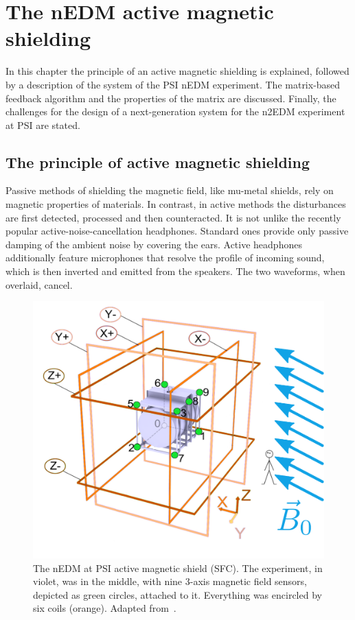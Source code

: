 \chapter{The nEDM active magnetic shielding}

\label{ch:nedm_sfc}
In this chapter the principle of an active magnetic shielding is explained, followed by a description of the system of the PSI nEDM experiment. The matrix-based feedback algorithm and the properties of the matrix are discussed. Finally, the challenges for the design of a next-generation system for the n2EDM experiment at PSI are stated.




\section{The principle of active magnetic shielding}
Passive methods of shielding the magnetic field, like mu-metal shields, rely on magnetic properties of materials. In contrast, in active methods the disturbances are first detected, processed and then counteracted. It is not unlike the recently popular active-noise-cancellation headphones. Standard ones provide only passive damping of the ambient noise by covering the ears. Active headphones additionally feature microphones that resolve the profile of incoming sound, which is then inverted and emitted from the speakers. The two waveforms, when overlaid, cancel.

\begin{figure}
  \centering
  \includegraphics[width=0.8\linewidth]{gfx/nEDM_SFC/SFCplain.pdf}
  \caption{The nEDM at PSI active magnetic shield (SFC). The experiment, in violet, was in the middle, with nine 3-axis magnetic field sensors, depicted as green circles, attached to it. Everything was encircled by six coils (orange). Adapted from~\cite{Franke2013}.}\label{fig:sfc-scheme}
\end{figure}

